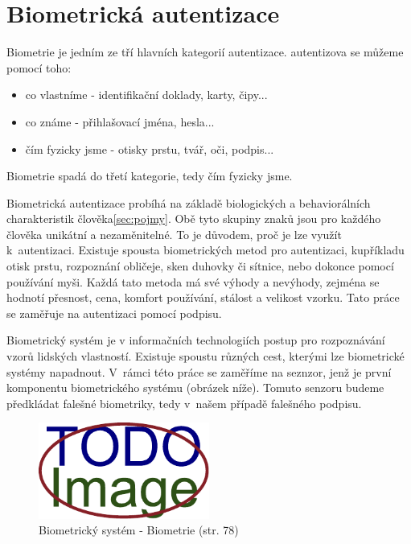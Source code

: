 \section{Biometrická autentizace}
Biometrie je jedním ze tří hlavních kategorií autentizace.
autentizova se můžeme pomocí toho:

\begin{itemize}
  \item{co vlastníme - identifikační doklady, karty, čipy...}   %
  \item{co známe - přihlašovací jména, hesla...}                %
  \item{čím fyzicky jsme - otisky prstu, tvář, oči, podpis...}  %
\end{itemize}                                                   %
Biometrie spadá do třetí kategorie, tedy čím fyzicky jsme. 

Biometrická autentizace probíhá na základě biologických a behaviorálních charakteristik člověka\ref{sec:pojmy}. 
Obě tyto skupiny znaků jsou pro každého člověka unikátní a nezaměnitelné. To je důvodem, proč je lze využít k~autentizaci.
Existuje spousta biometrických metod pro autentizaci, kupříkladu otisk prstu, rozpoznání obličeje, sken duhovky či sítnice, nebo dokonce pomocí používání myši. 
Každá tato metoda má své výhody a nevýhody, zejména se hodnotí přesnost, cena, komfort používání, stálost a velikost vzorku. %
Tato práce se zaměřuje na autentizaci pomocí podpisu.

Biometrický systém je v informačních technologiích postup pro rozpoznávání vzorů lidských vlastností.       %
Existuje spoustu různých cest, kterými lze biometrické systémy napadnout.                                   %
V~rámci této práce se zaměříme na seznzor, jenž je první komponentu biometrického systému (obrázek níže).   %
Tomuto senzoru budeme předkládat falešné biometriky, tedy v~našem případě falešného podpisu.                %

\begin{figure}[h]
  \centering
  \includegraphics[width=0.5\textwidth]{obrazky-figures/placeholder.pdf}
  \caption{Biometrický systém - Biometrie (str. 78)}
  \label{fig:my-pdf}
\end{figure}

